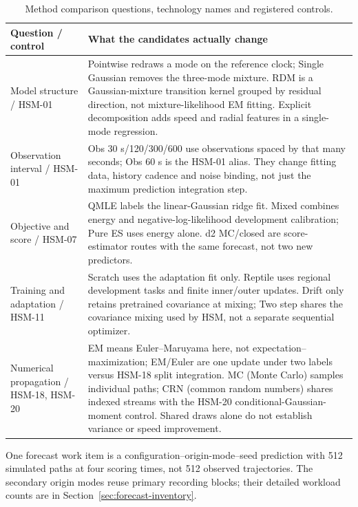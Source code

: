 \begingroup
\renewcommand{\topfraction}{.95}
\renewcommand{\textfraction}{.02}
\begin{table}[htbp]
\centering\footnotesize
\caption{Method comparison questions, technology names and registered controls.}
\label{tab:method-reader}\hypertarget{tab:method-reader}{}
\begin{tabular}{@{}p{.22\linewidth}p{.69\linewidth}@{}}
\toprule
Question / control & What the candidates actually change\\
\midrule
Model structure / HSM-01 &
Pointwise redraws a mode on the reference clock; Single Gaussian removes the
three-mode mixture. RDM is a Gaussian-mixture transition kernel grouped by
residual direction, not mixture-likelihood EM fitting. Explicit decomposition
adds speed and radial features in a single-mode regression.\\
Observation interval / HSM-01 &
Obs 30 s/120/300/600 use observations spaced by that many seconds; Obs 60 s is the
HSM-01 alias. They change fitting data, history cadence and noise binding,
not just the maximum prediction integration step.\\
Objective and score / HSM-07 &
QMLE labels the linear-Gaussian ridge fit. Mixed combines energy and
negative-log-likelihood development calibration; Pure ES uses energy alone.
d2 MC/closed are score-estimator routes with the same forecast, not two new
predictors.\\
Training and adaptation / HSM-11 &
Scratch uses the adaptation fit only. Reptile uses regional development
tasks and finite inner/outer updates. Drift only retains pretrained
covariance at mixing; Two step shares the covariance mixing used by HSM,
not a separate sequential optimizer.\\
Numerical propagation / HSM-18, HSM-20 &
EM means Euler--Maruyama here, not expectation--maximization; EM/Euler are
one update under two labels versus HSM-18 split integration. MC (Monte Carlo)
samples individual paths; CRN (common random numbers) shares indexed streams
with the HSM-20 conditional-Gaussian-moment control. Shared draws alone do
not establish variance or speed improvement.\\
\bottomrule
\end{tabular}
\end{table}

One forecast work item is a configuration--origin-mode--seed prediction
with 512 simulated paths at four scoring times, not 512 observed trajectories.
The secondary origin modes reuse primary recording blocks; their detailed
workload counts are in Section~\ref{sec:forecast-inventory}.

